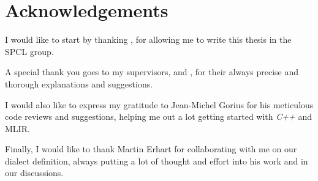 

\begingroup

\let\clearpage\relax
\let\cleardoublepage\relax
\let\cleardoublepage\relax

\chapter*{Acknowledgements}

I would like to start by thanking \myProf, for allowing me to write this thesis in the SPCL group.

\noindent A special thank you goes to my supervisors, \mySupervisorOne and \mySupervisorTwo, for their always precise and thorough explanations and suggestions.

\noindent I would also like to express my gratitude to Jean-Michel Gorius for his meticulous code reviews and suggestions, helping me out a lot getting started with \textit{C++} and MLIR.

\noindent Finally, I would like to thank Martin Erhart for collaborating with me on our dialect definition, always putting a lot of thought and effort into his work and in our discussions.

\endgroup